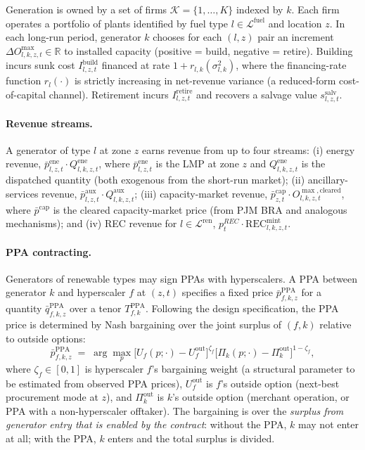 \documentclass[12pt,letterpaper]{article}
\begin{document}
Generation is owned by a set of firms $\mathcal{K} = \{1, \dots, K\}$
indexed by $k$. Each firm operates a portfolio of plants identified by fuel
type $l \in \mathcal{L}^{\text{fuel}}$ and location $z$. In each long-run
period, generator $k$ chooses for each $(l,z)$ pair an increment $\Delta
O^{\max}_{l,k,z,t} \in \mathbb{R}$ to installed capacity (positive = build,
negative = retire). Building incurs sunk cost $I^{\text{build}}_{l,z,t}$
financed at rate $1 + r_{l,k}(\sigma^2_{l,k})$, where the financing-rate
function $r_l(\cdot)$ is strictly increasing in net-revenue variance (a
reduced-form cost-of-capital channel). Retirement incurs $I^{\text{retire}}_{l,z,t}$
and recovers a salvage value $s^{\text{salv}}_{l,z,t}$.

\paragraph{Revenue streams.} A generator of type $l$ at zone $z$ earns
revenue from up to four streams: (i) energy revenue, $\bar p^{\text{ene}}_{l,z,t}
\cdot Q^{\text{ene}}_{l,k,z,t}$, where $\bar p^{\text{ene}}_{l,z,t}$ is the
LMP at zone $z$ and $Q^{\text{ene}}_{l,k,z,t}$ is the dispatched quantity
(both exogenous from the short-run market); (ii) ancillary-services revenue,
$\bar p^{\text{aux}}_{l,z,t} \cdot Q^{\text{aux}}_{l,k,z,t}$; (iii) capacity-market
revenue, $\bar p^{\text{cap}}_{z,t} \cdot O^{\max,\text{cleared}}_{l,k,z,t}$,
where $\bar p^{\text{cap}}$ is the cleared capacity-market price (from PJM
BRA and analogous mechanisms); and (iv) REC revenue for $l \in
\mathcal{L}^{\text{ren}}$, $p^{REC}_t \cdot \text{REC}^{\text{mint}}_{l,k,z,t}$.

\paragraph{PPA contracting.} Generators of renewable types may sign PPAs
with hyperscalers. A PPA between generator $k$ and hyperscaler $f$ at
$(z,t)$ specifies a fixed price $\bar p^{\text{PPA}}_{f,k,z}$ for a
quantity $\bar q^{\text{PPA}}_{f,k,z}$ over a tenor $T^{\text{PPA}}_{f,k}$.
Following the design specification, the PPA price is determined by Nash
bargaining over the joint surplus of $(f,k)$ relative to outside options:
\begin{equation}
\label{eq:ppa_bargain}
\bar p^{\text{PPA}}_{f,k,z} \;=\; \arg\max_{p}
\big[ U_f(p; \cdot) - U_f^{\text{out}} \big]^{\zeta_f}
\big[ \Pi_k(p; \cdot) - \Pi_k^{\text{out}} \big]^{1 - \zeta_f},
\end{equation}
where $\zeta_f \in [0,1]$ is hyperscaler $f$'s bargaining weight (a
structural parameter to be estimated from observed PPA prices),
$U_f^{\text{out}}$ is $f$'s outside option (next-best procurement mode at
$z$), and $\Pi_k^{\text{out}}$ is $k$'s outside option (merchant operation,
or PPA with a non-hyperscaler offtaker). The bargaining is over the
\emph{surplus from generator entry that is enabled by the contract}:
without the PPA, $k$ may not enter at all; with the PPA, $k$ enters and the
total surplus is divided.
\end{document}
